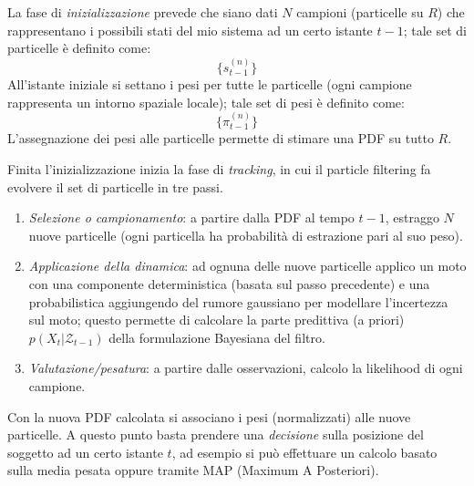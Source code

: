 \documentclass[a4paper,oneside,titlepage]{book}
\begin{document}
La fase di \textit{inizializzazione} prevede che siano dati $N$ campioni (particelle su $R$) che rappresentano i possibili stati del mio sistema ad un certo istante $t-1$; tale set di particelle è definito come:
\[ \{ s_{t-1}^{(n)} \} \]
All'istante iniziale si settano i pesi per tutte le particelle (ogni campione rappresenta un intorno spaziale locale); tale set di pesi è definito come:
\[ \{ \pi_{t-1}^{(n)} \} \]
L'assegnazione dei pesi alle particelle permette di stimare una PDF su tutto $R$.

Finita l'inizializzazione inizia la fase di \textit{tracking}, in cui il particle filtering fa evolvere il set di particelle in tre passi.
\begin{enumerate}
    \item \textit{Selezione o campionamento}: a partire dalla PDF al tempo $t-1$, estraggo $N$ nuove particelle (ogni particella ha probabilità di estrazione pari al suo peso).
    \item \textit{Applicazione della dinamica}: ad ognuna delle nuove particelle applico un moto con una componente deterministica (basata sul passo precedente) e una probabilistica aggiungendo del rumore gaussiano per modellare l'incertezza sul moto; questo permette di calcolare la parte predittiva (a priori) $p(X_t | \mathcal{Z}_{t-1})$ della formulazione Bayesiana del filtro.
    \item \textit{Valutazione/pesatura}: a partire dalle osservazioni, calcolo la likelihood di ogni campione.
\end{enumerate}
Con la nuova PDF calcolata si associano i pesi (normalizzati) alle nuove particelle. A questo punto basta prendere una \textit{decisione} sulla posizione del soggetto ad un certo istante $t$, ad esempio si può effettuare un calcolo basato sulla media pesata oppure tramite MAP (Maximum A Posteriori).
\end{document}
